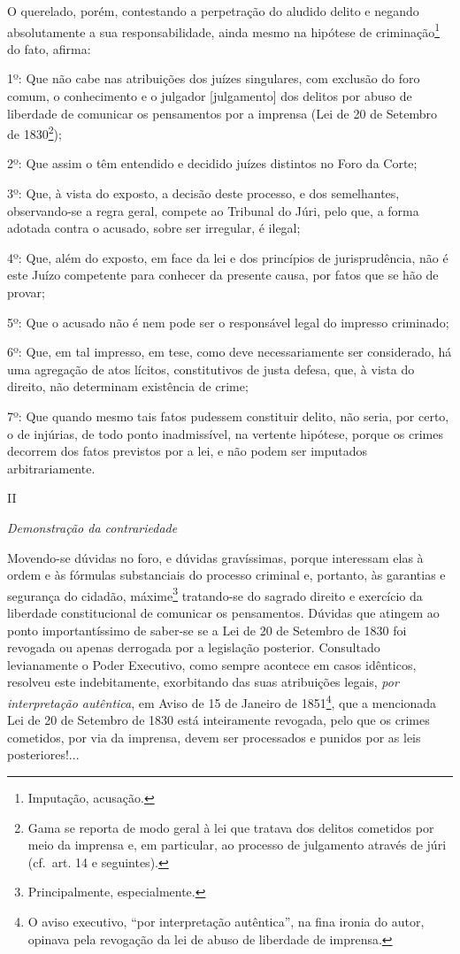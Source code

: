 O querelado, porém, contestando a perpetração do aludido delito e
negando absolutamente a sua responsabilidade, ainda mesmo na hipótese de
criminação\footnote{Imputação, acusação.} do fato, afirma:

1º: Que não cabe nas atribuições dos juízes singulares, com exclusão do
foro comum, o conhecimento e o julgador {[}julgamento{]} dos delitos por
abuso de liberdade de comunicar os pensamentos por a imprensa (Lei de 20
de Setembro de 1830\footnote{Gama se reporta de modo geral à lei que
  tratava dos delitos cometidos por meio da imprensa e, em particular,
  ao processo de julgamento através de júri (cf.~art. 14 e seguintes).});

2º: Que assim o têm entendido e decidido juízes distintos no Foro da
Corte;

3º: Que, à vista do exposto, a decisão deste processo, e dos
semelhantes, observando-se a regra geral, compete ao Tribunal do Júri,
pelo que, a forma adotada contra o acusado, sobre ser irregular, é
ilegal;

4º: Que, além do exposto, em face da lei e dos princípios de
jurisprudência, não é este Juízo competente para conhecer da presente
causa, por fatos que se hão de provar;

5º: Que o acusado não é nem pode ser o responsável legal do impresso
criminado;

6º: Que, em tal impresso, em tese, como deve necessariamente ser
considerado, há uma agregação de atos lícitos, constitutivos de justa
defesa, que, à vista do direito, não determinam existência de crime;

7º: Que quando mesmo tais fatos pudessem constituir delito, não seria,
por certo, o de injúrias, de todo ponto inadmissível, na vertente
hipótese, porque os crimes decorrem dos fatos previstos por a lei, e não
podem ser imputados arbitrariamente.

II

\emph{Demonstração da contrariedade}

Movendo-se dúvidas no foro, e dúvidas gravíssimas, porque interessam
elas à ordem e às fórmulas substanciais do processo criminal e,
portanto, às garantias e segurança do cidadão, máxime\footnote{Principalmente,
  especialmente.} tratando-se do sagrado direito e exercício da
liberdade constitucional de comunicar os pensamentos. Dúvidas que
atingem ao ponto importantíssimo de saber-se se a Lei de 20 de Setembro
de 1830 foi revogada ou apenas derrogada por a legislação posterior.
Consultado levianamente o Poder Executivo, como sempre acontece em casos
idênticos, resolveu este indebitamente, exorbitando das suas atribuições
legais, \emph{por interpretação autêntica}, em Aviso de 15 de Janeiro de
1851\footnote{O aviso executivo, ``por interpretação autêntica'', na
  fina ironia do autor, opinava pela revogação da lei de abuso de
  liberdade de imprensa.}, que a mencionada Lei de 20 de Setembro de
1830 está inteiramente revogada, pelo que os crimes cometidos, por via
da imprensa, devem ser processados e punidos por as leis posteriores!...


